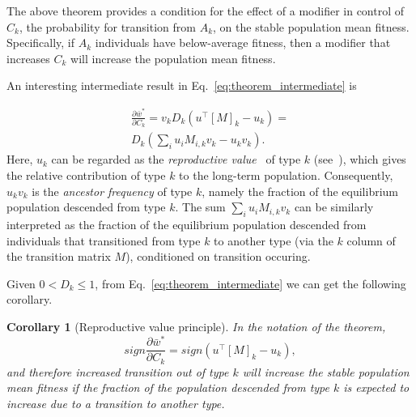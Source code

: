 \documentclass[9pt, a4paper, twocolumn]{extarticle}
\newcommand*{\tr}{^\intercal}
\newtheorem{corollary}{Corollary}
\begin{document}
The above theorem provides a condition for the effect of a modifier in control of $C_k$, the probability for transition from $A_k$, on the stable population mean fitness.
Specifically, if $A_k$ individuals have below-average fitness, then a modifier that increases $C_k$ will increase the population mean fitness.


An interesting intermediate result in Eq.~\ref{eq:theorem_intermediate} is

\begin{equation}
\begin{aligned}
\frac{\partial \bar{w}^*}{\partial C_k} = 
v_k D_k (u\tr[M]_k - u_k) = \\
D_k (\sum_i{u_i M_{i,k} v_k} - u_k v_k).
\end{aligned}
\end{equation}
Here, $u_k$ can be regarded as the \emph{reproductive value}~\citep[pg.~27]{Fisher1930} of type $k$ (see~), which gives the relative contribution of type $k$ to the long-term population.
Consequently, $u_k v_k$ is the \emph{ancestor frequency} \citep{Hermisson2002} of type $k$, namely the fraction of the equilibrium population descended from type $k$.
The sum $\sum_i{u_i M_{i,k} v_k}$ can be similarly interpreted as the fraction of the equilibrium population descended from individuals that transitioned from type $k$ to another type (via the $k$ column of the transition matrix $M$), conditioned on transition occuring.

Given $0 < D_k \le 1$, from Eq.~\ref{eq:theorem_intermediate} we can get the following corollary.

\begin{corollary}[Reproductive value principle]
In the notation of the theorem,
\begin{equation}
sign \frac{\partial \bar{w}^*}{\partial C_k} = 
sign (u\tr [M]_k - u_k),
\end{equation}
and therefore increased transition out of type $k$ will increase the stable population mean fitness if the fraction of the population descended from type $k$ is expected to increase due to a transition to another type. 
\end{corollary}

\end{document}
